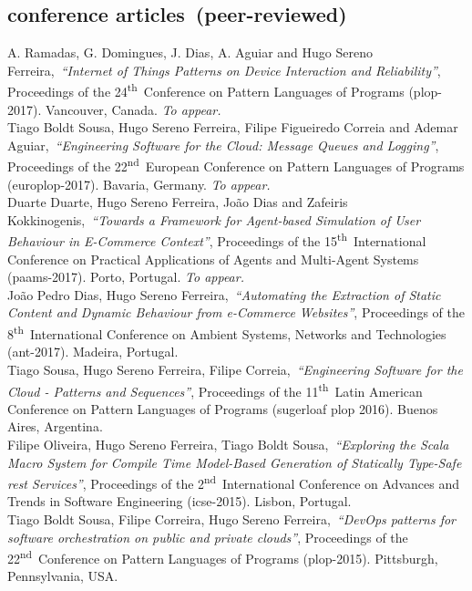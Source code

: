 \documentclass[9pt, a4paper, pstricks]{article}
\newcommand{\current}{{\hspace{-0.97em}\color{feup}$\star$}~}
\newcommand{\years}[1]{\marginnote{\small #1}}
\newcommand{\nth}{\textsuperscript{th}~}
\newcommand{\nd}{\textsuperscript{nd}~}
\newcommand{\publication}[4]{\years{#1}#2,~\emph{``#3''}, #4}
\newcommand{\tobepub}[4]{\years{\current~#1}#2,~\emph{``#3''}, #4 {\color{feup} \emph{To appear.}}}
\begin{document}
{\subsection*{conference articles~(peer-reviewed)}

\noindent
\tobepub{\current~2017}{A. Ramadas, G. Domingues, J. Dias, A. Aguiar and Hugo Sereno Ferreira}{Internet of Things Patterns on Device Interaction and Reliability}{Proceedings of the 24\nth Conference on Pattern Languages of Programs {\sc (plop-2017)}. Vancouver, Canada.}\\
\tobepub{\current~2017}{Tiago Boldt Sousa, Hugo Sereno Ferreira, Filipe Figueiredo Correia and Ademar Aguiar}{Engineering Software for the Cloud: Message Queues and Logging}{Proceedings of the 22\nd European Conference on Pattern Languages of Programs {\sc (europlop-2017)}. Bavaria, Germany.}\\
\tobepub{\current~2017}{Duarte Duarte, Hugo Sereno Ferreira, João Dias and Zafeiris Kokkinogenis}{Towards a Framework for Agent-based Simulation of User Behaviour in E-Commerce Context}{Proceedings of the 15\nth International Conference on Practical Applications of Agents and Multi-Agent Systems {\sc (paams-2017)}. Porto, Portugal.}\\
\publication{2017}{João Pedro Dias, Hugo Sereno Ferreira}{Automating the Extraction of Static Content and Dynamic Behaviour from e-Commerce Websites}{Proceedings of the 8\nth International Conference on Ambient Systems, Networks and Technologies {\sc (ant-2017)}. Madeira, Portugal.}\\
\publication{2016}{Tiago Sousa, Hugo Sereno Ferreira, Filipe Correia}{Engineering Software for the Cloud - Patterns and Sequences}{Proceedings of the 11\nth Latin American Conference on Pattern Languages of Programs {\sc (sugerloaf plop 2016)}. Buenos Aires, Argentina.}\\
\publication{2015}{Filipe Oliveira, Hugo Sereno Ferreira, Tiago Boldt Sousa}{Exploring the Scala Macro System for Compile Time Model-Based Generation of Statically Type-Safe {\sc rest} Services}{Proceedings of the 2\nd International Conference on Advances and Trends in Software Engineering {\sc (icse-2015)}. Lisbon, Portugal.}\\
\publication{2015}{Tiago Boldt Sousa, Filipe Correira, Hugo Sereno Ferreira}{DevOps patterns for software orchestration on public and private clouds}{Proceedings of the 22\nd Conference on Pattern Languages of Programs {\sc (plop-2015)}. Pittsburgh, Pennsylvania, USA.}\\
}
\end{document}
